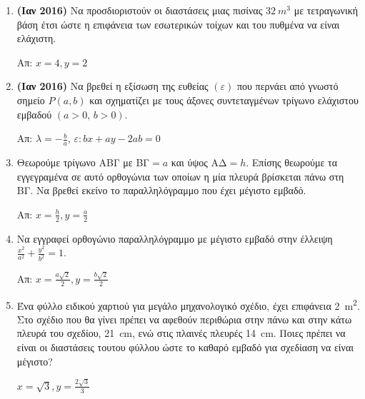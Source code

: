 




\everymath{\displaystyle}
\thispagestyle{askhseis}



\begin{center}
  \minibox{\large \bfseries \textcolor{Col1}{Προβλήματα Ακροτάτων}}
\end{center}

\vspace{\baselineskip}

\begin{enumerate}

	\item {\bfseries (Ιαν 2016)} Να προσδιοριστούν οι διαστάσεις μιας πισίνας 
    $ \SI{32}{m^{3}} $ με τετραγωνική βάση έτσι ώστε η επιφάνεια των εσωτερικών 
    τοίχων και του πυθμένα να είναι ελάχιστη. 

		\hfill Απ: $x=4, y=2$

	\item {\bfseries (Ιαν 2016)} Να βρεθεί η εξίσωση της ευθείας $ (\varepsilon)
		$ που περνάει από γνωστό σημείο $ P(a,b) $ και σχηματίζει με τους άξονες
		συντεταγμένων τρίγωνο ελάχιστου εμβαδού $ (a>0,\, b>0) $.

		\hfill Απ: $ \lambda = -\frac{b}{a} $, $\varepsilon: bx + ay - 2ab = 0$

	\item Θεωρούμε τρίγωνο ΑΒΓ με  ΒΓ$=a $ και ύψος ΑΔ$=h$. Επίσης θεωρούμε τα
		εγγεγραμένα σε αυτό ορθογώνια των οποίων η μία πλευρά βρίσκεται πάνω στη
		ΒΓ. Να βρεθεί εκείνο το παραλληλόγραμμο που έχει μέγιστο εμβαδό.
		
		\hfill Απ: $ x = \frac{h}{2}, y= \frac{a}{2} $

	\item Να εγγραφεί ορθογώνιο παραλληλόγραμμο με μέγιστο εμβαδό στην έλλειψη $
		\frac{x^{2}}{a^{2}} + \frac{y^{2}}{b^{2}} = 1 $. 

		\hfill Απ: $ x = \frac{a\sqrt{2}}{2}, y = \frac{b \sqrt{2}}{2} $

	\item Ένα φύλλο ειδικού χαρτιού για μεγάλο μηχανολογικό σχέδιο, έχει
		επιφάνεια \SI{2}{m^{2}}. Στο σχέδιο που θα γίνει πρέπει να αφεθούν
		περιθώρια στην πάνω και στην κάτω πλευρά του σχεδίου, \SI{21}{cm}, ενώ
		στις πλαινές πλευρές \SI{14}{cm}. Ποιες πρέπει να είναι οι διαστάσεις
		τουτου φύλλου ώστε το καθαρό εμβαδό για σχεδίαση να είναι μέγιστο?

		\hfill $ x = \sqrt{3}, y = \frac{2 \sqrt{3}}{3} $


\end{enumerate}
